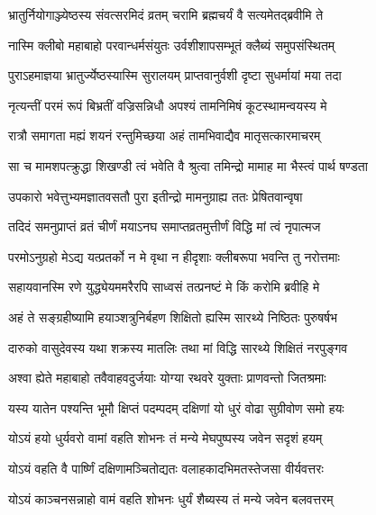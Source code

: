 


\twolineshloka
{भ्रातुर्नियोगाञ्ज्येष्ठस्य संवत्सरमिदं व्रतम्}
{चरामि ब्रह्मचर्यं वै सत्यमेतद्ब्रवीमि ते}


\twolineshloka
{नास्मि क्लीबो महाबाहो परवान्धर्मसंयुतः}
{उर्वशीशापसम्भूतं क्लैब्यं समुपसंस्थितम्}


\twolineshloka
{पुराऽहमाज्ञया भ्रातुर्ज्येष्ठस्यास्मि सुरालयम्}
{प्राप्तवानुर्वशी दृष्टा सुधर्मायां मया तदा}


\twolineshloka
{नृत्यन्तीं परमं रूपं बिभ्रतीं वज्रिसन्निधौ}
{अपश्यं तामनिमिषं कूटस्थामन्वयस्य मे}


\twolineshloka
{रात्रौ समागता मह्यं शयनं रन्तुमिच्छया}
{अहं तामभिवाद्यैव मातृसत्कारमाचरम्}


\twolineshloka
{सा च मामशपत्क्रुद्धा शिखण्डी त्वं भवेति वै}
{श्रुत्वा तमिन्द्रो मामाह मा भैस्त्वं पार्थ षण्डता}


\twolineshloka
{उपकारो भवेत्तुभ्यमज्ञातवसतौ पुरा}
{इतीन्द्रो मामनुग्राह्य ततः प्रेषितवान्वृषा}


\twolineshloka
{तदिदं समनुप्राप्तं व्रतं चीर्णं मयाऽनघ}
{समाप्तव्रतमुत्तीर्णं विद्धि मां त्वं नृपात्मज}




\twolineshloka
{परमोऽनुग्रहो मेऽद्य यत्प्रतर्को न मे वृथा}
{न हीदृशाः क्लीबरूपा भवन्ति तु नरोत्तमाः}


\twolineshloka
{सहायवानस्मि रणे युद्ध्येयममरैरपि}
{साध्वसं तत्प्रनष्टं मे किं करोमि ब्रवीहि मे}


\twolineshloka
{अहं ते सङ्ग्रहीष्यामि हयाञ्शत्रुनिर्बहण}
{शिक्षितो ह्यस्मि सारथ्ये निष्ठितः पुरुषर्षभ}


\twolineshloka
{दारुको वासुदेवस्य यथा शक्रस्य मातलिः}
{तथा मां विद्धि सारथ्ये शिक्षितं नरपुङ्गव}


\twolineshloka
{अश्वा ह्येते महाबाहो तवैवाहवदुर्जयाः}
{योग्या रथवरे युक्ताः प्राणवन्तो जितश्रमाः}


\twolineshloka
{यस्य यातेन पश्यन्ति भूमौ क्षिप्तं पदम्पदम्}
{दक्षिणां यो धुरं वोढा सुग्रीवोण समो हयः}


\twolineshloka
{योऽयं हयो धुर्यवरो वामां वहति शोभनः}
{तं मन्ये मेघपुष्पस्य जवेन सदृशं हयम्}


\twolineshloka
{योऽयं वहति वै पार्ष्णिं दक्षिणामञ्चितोद्यतः}
{वलाहकादभिमतस्तेजसा वीर्यवत्तरः}


\twolineshloka
{योऽयं काञ्चनसन्नाहो वामं वहति शोभनः}
{धुर्यं शैब्यस्य तं मन्ये जवेन बलवत्तरम्}


